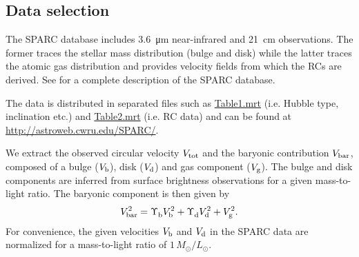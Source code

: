 \subsection{Data selection}
\label{sec:data}

The SPARC database includes \SI{3.6}{\micro\meter} near-infrared and \SI{21}{\centi\meter} observations. The former traces the stellar mass distribution (bulge and disk) while the latter traces the atomic gas distribution and provides velocity fields from which the RCs are derived. See \citet{2016AJ....152..157L} for a complete description of the SPARC database.

The data is distributed in separated files such as \href{http://astroweb.cwru.edu/SPARC/SPARC_Lelli2016c.mrt}{Table1.mrt} (i.e. Hubble type, inclination etc.) and \href{http://astroweb.cwru.edu/SPARC/MassModels_Lelli2016c.mrt}{Table2.mrt} (i.e. RC data) and can be found at \url{http://astroweb.cwru.edu/SPARC/}. %

We extract the observed circular velocity $V_\mathrm{tot}$ and the baryonic contribution $V_\mathrm{bar}$, composed of a bulge ($V_\mathrm{b}$), disk ($V_\mathrm{d}$) and gas component ($V_\mathrm{g}$). The bulge and disk components are inferred from surface brightness observations for a given mass-to-light ratio. The baryonic component is then given by 
%
\begin{equation}
	\label{eqn:baryonic-sum}
	\SYMvbar^2 = \Upsilon_\mathrm{b}^{\phantom{2}} \SYMvbulge^2 + \Upsilon_\mathrm{d}^{\phantom{2}} \SYMvdisk^2 + \SYMvgas^2.
\end{equation} 
%
For convenience, the given velocities $V_\mathrm{b}$ and $V_\mathrm{d}$ in the SPARC data are normalized for a mass-to-light ratio of $1\,M_\odot/L_\odot$.


